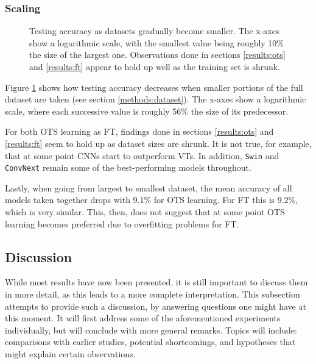 \subsubsection{Scaling}

\begin{figure}[tb]
    \centering
    \def\svgwidth{\textwidth}
    
    \caption{Testing accuracy as datasets gradually become smaller. The x-axes show a logarithmic scale, with the smallest value being roughly 10\% the size of the largest one. Observations done in sections \ref{results:ots} and \ref{results:ft} appear to hold up well as the training set is shrunk.}
    \label{results:img:scale}
\end{figure}

Figure \ref{results:img:scale} shows how testing accuracy decreases when smaller portions of the full dataset are taken (see section \ref{methods:dataset}). The x-axes show a logarithmic scale, where each successive value is roughly 56\% the size of its predecessor.

For both OTS learning as FT, findings done in sections \ref{results:ots} and \ref{results:ft} seem to hold up as dataset sizes are shrunk. It is not true, for example, that at some point CNNs start to outperform VTs. In addition, \texttt{Swin} and \texttt{ConvNext} remain some of the best-performing models throughout. 

Lastly, when going from largest to smallest dataset, the mean accuracy of all models taken together drops with 9.1\% for OTS learning. For FT this is 9.2\%, which is very similar. This, then, does not suggest that at some point OTS learning becomes preferred due to overfitting problems for FT.


\subsection{Discussion} \label{exp:int} %
While most results have now been presented, it is still important to discuss them in more detail, as this leads to a more complete interpretation. This subsection attempts to provide such a discussion, by answering questions one might have at this moment. It will first address some of the aforementioned experiments individually, but will conclude with more general remarks. Topics will include: comparisons with earlier studies, potential shortcomings, and hypotheses that might explain certain observations.

